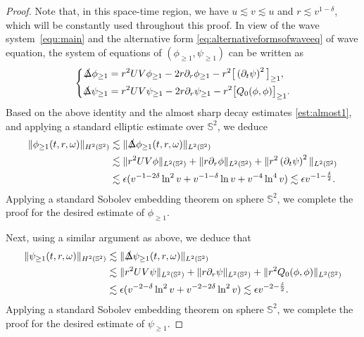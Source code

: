 \documentclass[a4paper,reqno]{amsart}
\theoremstyle{definition}
\numberwithin{equation}{section}
\def \pt{\partial_{t}}
\def\Deltas{\slashed{\Delta}}
\begin{document}
\begin{proof}
Note that, in this space-time region, we have $u\lesssim v\lesssim u$ and $r\lesssim v^{1-\delta}$, which will be constantly used throughout this proof. In view of the wave system~\eqref{equ:main} and the alternative form \eqref{eq:alternativeformsofwaveeq} of wave equation, the system of equations of $(\phi_{\ge 1},\psi_{\ge 1})$ can be written as 
   \begin{equation*}
    \left\{
    \begin{aligned}
        \Deltas\phi_{\ge 1}&=r^{2}UV\phi_{\ge 1}-2r\partial_{r}\phi_{\ge 1}-r^{2}\big[\left(\pt \psi\right)^{2}\big]_{\ge 1},\\
        \Deltas\psi_{\ge 1}&=r^{2}UV\psi_{\ge 1}-2r\partial_{r}\psi_{\ge 1}-r^{2}\big[Q_{0}(\phi,\phi)\big]_{\ge 1}.
    \end{aligned}\right.
 \end{equation*}
 Based on the above identity and the almost sharp decay estimates \eqref{est:almost1}, and applying a standard elliptic estimate over $\mathbb{S}^2$, we deduce
 \begin{equation*}
 \begin{aligned}
      \|\phi_{\ge 1}(t,r,\omega)\|_{H^{2}(\mathbb{S}^{2})}
      &\lesssim \|\Deltas \phi_{\ge 1}(t,r,\omega)\|_{L^{2}(\mathbb{S}^{2})}\\
      &\lesssim \|r^{2}UV\phi\|_{L^{2}(\mathbb{S}^{2})}
      +\|r\partial_{r}\phi\|_{L^{2}(\mathbb{S}^{2})}
      +\|r^{2}\left(\pt \psi\right)^{2}\|_{L^{2}(\mathbb{S}^{2})}\\
      &
      \lesssim \epsilon 
      (v^{-1-2\delta}\ln^{2}v+v^{-1-\delta}\ln v+v^{-4}\ln^{4}v)
      \lesssim \epsilon v^{-1-\frac{\delta}{2}}.
      \end{aligned}
 \end{equation*}
Applying a standard Sobolev embedding theorem on sphere $\mathbb{S}^{2}$, we complete the proof for the desired estimate of $\phi_{\geq 1}$. 

\smallskip
Next, using a similar argument as above, we deduce that 
  \begin{equation*}
 \begin{aligned}
      \|\psi_{\ge 1}(t,r,\omega)\|_{H^{2}(\mathbb{S}^{2})}
      &\lesssim \|\Deltas \psi_{\ge 1}(t,r,\omega)\|_{L^{2}(\mathbb{S}^{2})}\\
      &\lesssim \|r^{2}UV\psi\|_{L^{2}(\mathbb{S}^{2})}
      +\|r\partial_{r}\psi\|_{L^{2}(\mathbb{S}^{2})}
      +\|r^{2}Q_{0}(\phi,\phi)\|_{L^{2}(\mathbb{S}^{2})}\\
      &
      \lesssim \epsilon (v^{-2-\delta}\ln^{2}v+v^{-2-2\delta}\ln^{2}v)\lesssim 
      \epsilon v^{-2-\frac{\delta}{2}}.
      \end{aligned}
 \end{equation*}
Applying a standard Sobolev embedding theorem on sphere $\mathbb{S}^{2}$, we complete the proof for the desired estimate of $\psi_{\geq 1}$. 
\end{proof}
\end{document}
